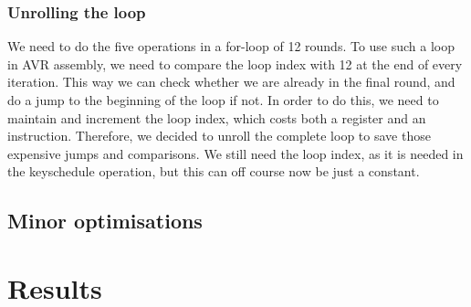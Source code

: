 \documentclass[a4paper]{article}
\begin{document}
\subsubsection{Unrolling the loop}

We need to do the five operations in a for-loop of 12 rounds. To use such a loop in AVR assembly, we need to compare the loop index with 12 at the end of every iteration. This way we can check whether we are already in the final round, and do a jump to the beginning of the loop if not. In order to do this, we need to maintain and increment the loop index, which costs both a register and an instruction. Therefore, we decided to unroll the complete loop to save those expensive jumps and comparisons. We still need the loop index, as it is needed in the keyschedule operation, but this can off course now be just a constant.

\subsection{Minor optimisations}

\section{Results}

\end{document}
